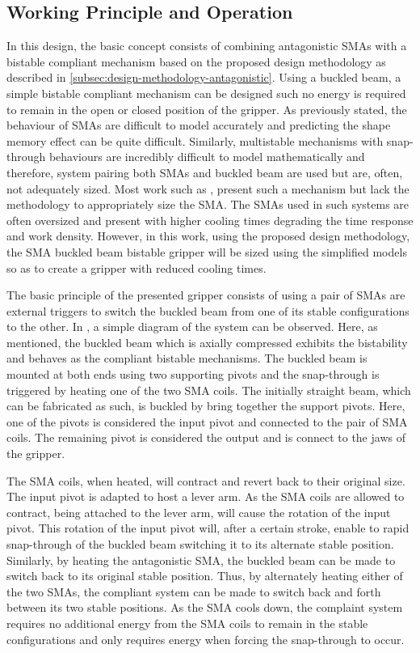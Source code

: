 \subsection{Working Principle and Operation}
In this design, the basic concept consists of combining antagonistic SMAs with a bistable compliant mechanism based on the proposed design methodology as described in \cref{subsec:design-methodology-antagonistic}. Using a buckled beam, a simple bistable compliant mechanism can be designed such no energy is required to remain in the open or closed position of the gripper. As previously stated, the behaviour of SMAs are difficult to model accurately and predicting the shape memory effect can be quite difficult. Similarly, multistable mechanisms with snap-through behaviours are incredibly difficult to model mathematically and therefore, system pairing both SMAs and buckled beam are used but are, often, not adequately sized. Most work such as \todocite, present such a mechanism but lack the methodology to appropriately size the SMA. The SMAs used in such systems are often oversized and present with higher cooling times degrading the time response and work density. However, in this work, using the proposed design methodology, the SMA buckled beam bistable gripper will be sized using the simplified models so as to create a gripper with reduced cooling times.

The basic principle of the presented gripper consists of using a pair of SMAs are external triggers to switch the buckled beam from one of its stable configurations to the other. In \todocite, a simple diagram of the system can be observed. Here, as mentioned, the buckled beam which is axially compressed exhibits the bistability and behaves as the compliant bistable mechanisms. The buckled beam is mounted at both ends using two supporting pivots and the snap-through is triggered by heating one of the two SMA coils. The initially straight beam, which can be fabricated as such, is buckled by bring together the support pivots. Here, one of the pivots is considered the input pivot and connected to the pair of SMA coils. The remaining pivot is considered the output and is connect to the jaws of the gripper.

The SMA coils, when heated, will contract and revert back to their original size. The input pivot is adapted to host a lever arm. As the SMA coils are allowed to contract, being attached to the lever arm, will cause the rotation of the input pivot. This rotation of the input pivot will, after a certain stroke, enable to rapid snap-through of the buckled beam switching it to its alternate stable position. Similarly, by heating the antagonistic SMA, the buckled beam can be made to switch back to its original stable position. Thus, by alternately heating either of the two SMAs, the compliant system can be made to switch back and forth between its two stable positions. As the SMA cools down, the complaint system requires no additional energy from the SMA coils to remain in the stable configurations and only requires energy when forcing the snap-through to occur.

